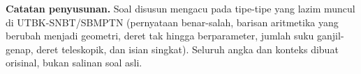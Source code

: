 \documentclass[a4paper,11pt]{article}
\newcounter{no}
\begin{document}
\par\vspace{0.6em}\begin{tcolorbox}[colback=softbg,colframe=navy!30,boxrule=0.5pt,arc=2pt,left=6pt,right=6pt,top=3pt,bottom=3pt]\footnotesize\textbf{Catatan penyusunan.} Soal disusun mengacu pada tipe-tipe yang lazim muncul di UTBK-SNBT/SBMPTN (pernyataan benar-salah, barisan aritmetika yang berubah menjadi geometri, deret tak hingga berparameter, jumlah suku ganjil-genap, deret teleskopik, dan isian singkat). Seluruh angka dan konteks dibuat orisinal, bukan salinan soal asli.\end{tcolorbox}
\end{document}
